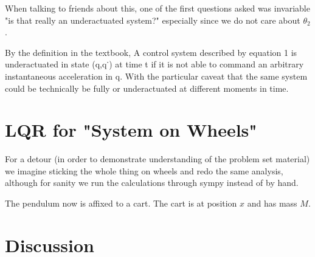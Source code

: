 \documentclass[conference]{IEEEtran}
\begin{document}
When talking to friends about this, one of the first questions asked was
invariable "is that really an underactuated system?" especially since we do not
care about $\theta_2$.

By the definition in the textbook, 
    A control system described by equation 1 is underactuated in state (q,q˙) at
    time t if it is not able to command an arbitrary instantaneous acceleration
    in q.
With the particular caveat that the same system could be technically be fully or underactuated at different moments in time.

\section{LQR for "System on Wheels"}


For a detour (in order to demonstrate understanding of the problem set material)
we imagine sticking the whole thing on wheels and redo the same analysis,
although for sanity we run the calculations through sympy instead of by hand.

The pendulum now is affixed to a cart. The cart is at position $x$ and has mass
$M$.


\cite{JS-aruco}






\section{Discussion}
\end{document}
